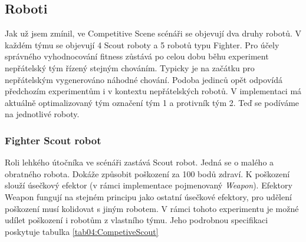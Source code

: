 \subsection*{Roboti}
Jak už jsem zmínil, ve Competitive Scene scénáři se objevují dva druhy robotů. V každém týmu se objevují 4 Scout roboty a 5 robotů typu Fighter. Pro účely správného vyhodnocování fitness zůstává po celou dobu běhu experiment nepřátelský tým řízený stejným chováním. Typicky je na začátku pro nepřátelským vygenerováno náhodné chování. Podoba jedinců opět odpovídá předchozím experimentům i v kontextu nepřátelských robotů. V implementaci má aktuálně optimalizovaný tým označení tým 1 a protivník tým 2. 
Teď se podíváme na jednotlivé roboty.
\subsubsection{Fighter Scout robot}
Roli lehkého útočníka ve scénáři zastává Scout robot. Jedná se o malého a obratného robota. Dokáže způsobit poškození za 100 bodů zdraví. K poškození slouží úsečkový efektor (v rámci implementace pojmenovaný \textit{Weapon}).  Efektory Weapon fungují na stejném principu jako ostatní úsečkové efektory, pro udělení poškození musí kolidovat s jiným robotem. V rámci tohoto experimentu je možné udílet poškození i robotům z vlastního týmu.  Jeho podrobnou specifikaci poskytuje tabulka \ref{tab04:CompetiveScout}
